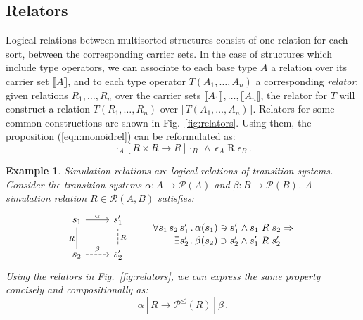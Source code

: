 \documentclass[11pt,oneside,draft]{book}
\newtheorem{example}[theorem]{Example}
\theoremstyle{definition}
\newcommand{\ifr}[1]{\mathrel{[{#1}]}}
\begin{document}
\subsection{Relators} \label{sec:relators}

Logical relations between multisorted structures
consist of one relation for each sort,
between the corresponding carrier sets.
In the case of structures which include type operators,
we can associate to each base type $A$
a relation over its carrier set $\llbracket A \rrbracket$,
and to each type operator $T(A_1, \ldots, A_n)$
a corresponding \emph{relator}:
given relations $R_1, \ldots, R_n$ over
the carrier sets $\llbracket A_1 \rrbracket, \ldots, \llbracket A_n \rrbracket$,
the relator for $T$
will construct a relation $T(R_1, \ldots, R_n)$
over $\llbracket T(A_1, \ldots, A_n) \rrbracket$.
Relators for some common constructions are shown in Fig.~\ref{fig:relators}.
Using them, the proposition (\ref{eqn:monoidrel}) can be reformulated as:
\[
  \cdot_A \ifr{R \times R \rightarrow R} \cdot_B
  \: \wedge \:
  \epsilon_A \mathrel{R} \epsilon_B \,.
\]

\begin{example} \label{ex:simrel} %
Simulation relations are
logical relations of transition systems.
Consider the transition systems
$\alpha : A \rightarrow \mathcal{P}(A)$ and
$\beta : B \rightarrow \mathcal{P}(B)$.
A simulation relation $R \in \mathcal{R}(A, B)$
satisfies:
\[
  \begin{tikzcd}[scale=0.8]
    s_1 \arrow[r, "\alpha"]
        \arrow[d, dash, "R"'] &
    s_1' \arrow[d, dashed, dash, "R"] \\
    s_2 \arrow[r, dashed, "\beta"] &
    s_2'
  \end{tikzcd}
  \qquad
  \label{eqn:simrel}
  \begin{array}{r@{\,.\,}l}
    \forall s_1 \, s_2 \, s_1' &
      \alpha(s_1) \ni s_1' \wedge s_1 \mathrel{R} s_2 \Rightarrow
    \\[0.25ex]
    \exists s_2' &
      \beta(s_2) \ni s_2' \wedge s_1' \mathrel{R} s_2'
  \end{array}
\]
Using the relators in Fig.~\ref{fig:relators},
we can express the same property
concisely and compositionally as:
\[
  \alpha \ifr{R \rightarrow \mathcal{P}^\le(R)} \beta \,.
\]
\end{example}
\end{document}
